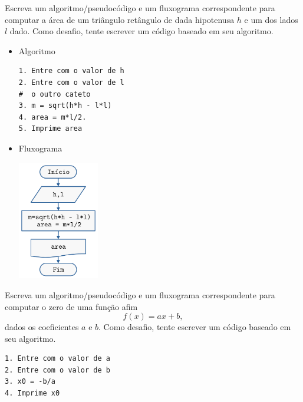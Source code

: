 \begin{exer}
  Escreva um algoritmo/pseudocódigo e um fluxograma correspondente para computar a área de um triângulo retângulo de dada hipotenusa $h$ e um dos lados $l$ dado. Como desafio, tente escrever um código {\python} baseado em seu algoritmo.
\end{exer}
\begin{resp}
  \begin{itemize}
    \item Algoritmo

\begin{verbatim}
1. Entre com o valor de h
2. Entre com o valor de l
#  o outro cateto
3. m = sqrt(h*h - l*l)
4. area = m*l/2.
5. Imprime area
\end{verbatim}

\item Fluxograma

\includegraphics[width=1.4in]{./cap_lingua/dados/fig_resp_triaRet/fig.png}

  \end{itemize}
\end{resp}

\begin{exer}
  Escreva um algoritmo/pseudocódigo e um fluxograma correspondente para computar o zero de uma função afim
  \begin{equation}
    f(x) = ax + b,
  \end{equation}
  dados os coeficientes $a$ e $b$. Como desafio, tente escrever um código {\python} baseado em seu algoritmo.
\end{exer}
\begin{resp}

\begin{verbatim}
1. Entre com o valor de a
2. Entre com o valor de b
3. x0 = -b/a
4. Imprime x0
\end{verbatim}
  
\end{resp}  


